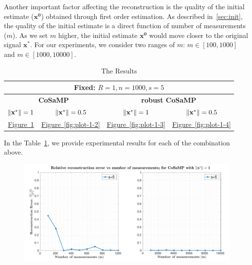 Another important factor affecting the reconstruction is the quality of the initial estimate ($\mathbf{{x}^0}$) obtained through first order estimation. As described in~\ref{sec:init}, the quality of the initial estimate is a direct function of number of measurements ($m$). As we set $m$ higher, the initial estimate $\mathbf{{x}^0}$ would move closer to the original signal $\mathbf{{x}^*}$. For our experiments, we consider two ranges of $m$: $m \in [100,1000]$ and $m \in [1000,10000]$.
\begin{center}
	\begin{table}
		\centering
		\begin{tabular}{cccc}\toprule
			\multicolumn{4}{c}{\small{\textbf{Fixed:} $R=1, n=1000, s=5$}} \\ \midrule
			\multicolumn{2}{c}{\textbf{CoSaMP}}&\multicolumn{2}{c}{\textbf{robust CoSaMP}}
			\\\cmidrule(r){1-2}\cmidrule(r){3-4}  
			\small{$\|\mathbf{{x}^*}\|=1$}&\small{$\|\mathbf{{x}^*}\|=0.5$}&\small{$\|\mathbf{{x}^*}\|=1$}&\small{$\|\mathbf{{x}^*}\|=0.5$}\\\midrule
			\hyperref[fig:plot-1-1]{Figure~\ref{fig:plot-1-1}} & \hyperref[fig:plot-1-2]{Figure~\ref{fig:plot-1-2}}
			& \hyperref[fig:plot-1-3]{Figure~\ref{fig:plot-1-3}}  & \hyperref[fig:plot-1-4]{Figure~\ref{fig:plot-1-4}} \\
			\bottomrule
		\end{tabular}
		\caption{The Results}\label{Tab2}
	\end{table} 	
\end{center}
In the Table~\ref{Tab2}, we provide experimental results for each of the combination above.

 
\begin{figure}[t]
	\begin{center}
		\includegraphics[width=\linewidth]{./fig/plot-1-1.pdf}
	\end{center}
	\caption{}
	\label{fig:plot-1-1}
\end{figure}


